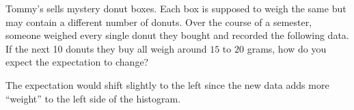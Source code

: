 \documentclass[../main.tex]{subfiles}
\begin{document}
\begin{exercise}
  Tommy's sells mystery donut boxes. Each box is supposed to weigh the same but may contain a different number of donuts.  Over the course of a semester, someone weighed every single donut they bought and recorded the following data.  If the next 10 donuts they buy all weigh around \(15\) to \(20\) grams, how do you expect the expectation to change?


    \begin{solution}
      The expectation would shift slightly to the left since the new data adds more ``weight'' to the left side of the histogram.
    \end{solution}
\end{exercise}
\end{document}
